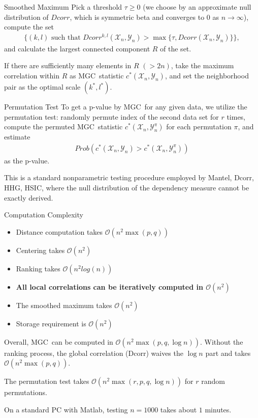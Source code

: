 \documentclass[mathserif,t]{beamer}
\newcommand{\Mgc}{MGC}
\begin{document}
\begin{frame}{Smoothed Maximum}
Pick a threshold $\tau \geq 0$ (we choose by an approximate null distribution of $Dcorr$, which is symmetric beta and converges to $0$ as $n \rightarrow \infty$), compute the set
\begin{align*}
\{(k,l) \mbox{ such that } Dcorr^{k,l}(\mathcal{X}_{n},\mathcal{Y}_{n})>\max\{\tau, Dcorr(\mathcal{X}_{n},\mathcal{Y}_{n})\} \},
\end{align*}
\pause
and calculate the largest connected component $R$ of the set.

\pause
\medskip
If there are sufficiently many elements in $R$ $(>2n)$, take the maximum correlation within $R$ as \Mgc~statistic $c^{*}(\mathcal{X}_{n},\mathcal{Y}_{n})$, 
\pause
and set the neighborhood pair as the optimal scale $(k^*,l^*)$.
\end{frame}

\begin{frame}{Permutation Test}
To get a p-value by \Mgc~for any given data, we utilize the permutation test: randomly permute index of the second data set for $r$ times, compute the permuted \Mgc~statistic $c^{*}(\mathcal{X}_{n},\mathcal{Y}_{n}^{\pi})$ for each permutation $\pi$, and estimate 
\begin{align*}
Prob(c^{*}(\mathcal{X}_{n},\mathcal{Y}_{n})>c^{*}(\mathcal{X}_{n},\mathcal{Y}_{n}^{\pi}))
\end{align*}
as the p-value.
\pause
\medskip

This is a standard nonparametric testing procedure employed by Mantel, Dcorr, HHG, HSIC, where the null distribution of the dependency measure cannot be exactly derived.
\end{frame}

\begin{frame}{Computation Complexity}
\begin{itemize}
\item Distance computation takes $\mathcal{O}(n^2 \max(p,q))$
\item Centering takes $\mathcal{O}(n^2)$
\item Ranking takes $\mathcal{O}(n^2 log(n))$
\item \textbf{All local correlations can be iteratively computed in $\mathcal{O}(n^2)$}
\item The smoothed maximum takes $\mathcal{O}(n^2)$
\item Storage requirement is $\mathcal{O}(n^2)$
\end{itemize}

\pause
Overall, \Mgc~can be computed in $\mathcal{O}(n^2 \max(p,q,\log n))$. Without the ranking process, the global correlation (Dcorr) waives the $\log n$ part and takes $\mathcal{O}(n^2 \max(p,q))$.

\pause
\medskip
The permutation test takes $\mathcal{O}(n^2 \max(r,p,q,\log n))$ for $r$ random permutations.
\pause
\medskip

On a standard PC with Matlab, testing $n=1000$ takes about $1$ minutes.
\end{frame}
\end{document}
